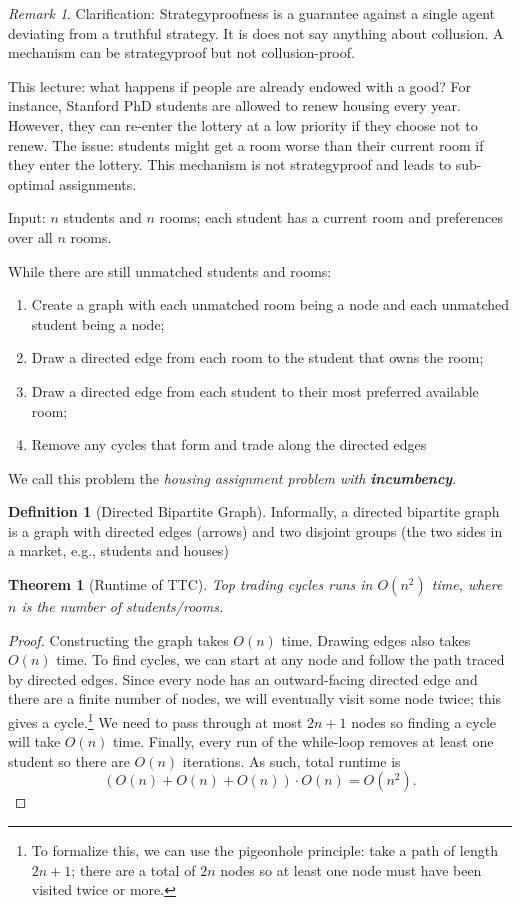 \documentclass[dvipsnames]{article}
\newtheorem{theorem}{Theorem}[section]
\theoremstyle{definition}
\newtheorem{definition}{Definition}[section]
\theoremstyle{remark}
\newtheorem*{remark}{Remark}
\newenvironment{mech}[1]{\begin{tcolorbox}[colback=red!5!white,colframe=red!75!black,title={#1}]}{\end{tcolorbox}}
\begin{document}
\begin{remark}
	Clarification: Strategyproofness is a guarantee against a single agent deviating from a truthful strategy.
	It is does not say anything about collusion. A mechanism can be strategyproof but not collusion-proof.
\end{remark}

This lecture: what happens if people are already endowed with a good? For instance, Stanford PhD students are allowed to renew housing every year. However, they can re-enter the lottery at a low priority if they choose not to renew. The issue: students might get a room worse than their current room if they enter the lottery. This mechanism is not strategyproof and leads to sub-optimal assignments. 

Input: $n$ students and $n$ rooms; each student has a current room and preferences over all $n$ rooms.
\begin{mech}{Top Trading Cycles}
	While there are still unmatched students and rooms: 
	\begin{enumerate}
		\item Create a graph with each unmatched room being a node and each unmatched student being a node;
		\item Draw a directed edge from each room to the student that owns the room;
		\item Draw a directed edge from each student to their most preferred available room;
		\item Remove any cycles that form and trade along the directed edges
	\end{enumerate}
\end{mech}

We call this problem the \textit{housing assignment problem with \textbf{incumbency}}. 

\begin{definition}[Directed Bipartite Graph]
	Informally, a directed bipartite graph is a graph with directed edges (arrows) and two disjoint groups (the two sides in a market, e.g., students and houses)
\end{definition}

\begin{theorem}[Runtime of TTC]
	Top trading cycles runs in $O(n^2)$ time, where $n$ is the number of students/rooms. 
\end{theorem}

\begin{proof}
	Constructing the graph takes $O(n)$ time. Drawing edges also takes $O(n)$ time. 
	To find cycles, we can start at any node and follow the path traced by directed edges. Since every node has an outward-facing directed edge and there are a finite number of nodes, we will eventually visit some node twice; this gives a cycle.\footnote{To formalize this, we can use the pigeonhole principle: take a path of length $2n+1$; there are a total of $2n$ nodes so at least one node must have been visited twice or more.} 
	We need to pass through at most $2n+1$ nodes so finding a cycle will take $O(n)$ time. Finally, every run of the while-loop removes at least one student so there are $O(n)$ iterations. As such, total runtime is
	$$(O(n)+O(n)+O(n)) \cdot O(n) = O(n^2).$$
\end{proof}
\end{document}
